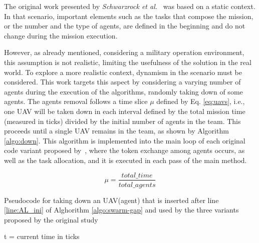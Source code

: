 
The original work presented by \textit{Schwarzrock et al.}~\cite{MAS07} was based on a static context. In that scenario, important elements such as the tasks that compose the mission, or the number and the type of agents, are defined in the beginning and do not change during the mission execution.

However, as already mentioned, considering a military operation environment, this assumption is not realistic, limiting the usefulness of the solution in the real world. To explore a more realistic context, dynamism in the scenario must be considered. This work targets this aspect by considering a varying number of agents during the execution of the algorithms, randomly taking down of some agents. 
The agents removal follows a time slice $\mu$ defined by Eq. \ref{eq:uavs}, i.e., one UAV will be taken down in each interval defined by the total mission time (measured in ticks) divided by the initial number of agents in the team. This proceeds until a single UAV remains in the team, as shown by Algorithm \ref{algo:down}. This algorithm is implemented into the main loop of each original code variant proposed by~\cite{MAS07}, where the token exchange among agents occurs, as well as the task allocation, and it is executed in each pass of the main method.

\begin{equation} \label{eq:uavs}
	\mu = \frac{total\_time}{total\_agents}
\end{equation}

\begin{algorithm}[!ht]
	\caption{Pseudocode for taking down an UAV(agent) that is inserted after line \ref{line:AL_ini} of Alghorithm \ref{algo:swarm-gap} and used by the three variants proposed by the original study \cite{MAS07}}
	\label{algo:down}
	
	\SetAlgoLined
	\DontPrintSemicolon
	\SetNlSkip{0.3em}
	
	t = current time in ticks \;
	
\end{algorithm}

